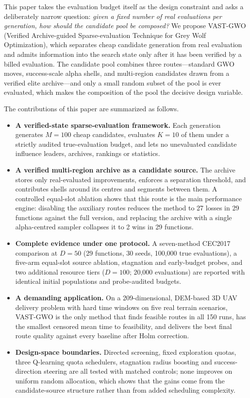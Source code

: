 \documentclass[journal]{IEEEtran}
\newcommand{\method}{VAST-GWO}
\begin{document}
This paper takes the evaluation budget itself as the design constraint and
asks a deliberately narrow question: \emph{given a fixed number of real
evaluations per generation, how should the candidate pool be composed?} We
propose \method{} (Verified Archive-guided Sparse-evaluation Technique for
Grey Wolf Optimization), which separates cheap candidate generation from real
evaluation and admits information into the search state only after it has
been verified by a billed evaluation. The candidate pool combines three
routes---standard GWO moves, success-scale alpha shells, and multi-region
candidates drawn from a verified elite archive---and only a small random
subset of the pool is ever evaluated, which makes the composition of the pool
the decisive design variable.

The contributions of this paper are summarized as follows.

\begin{itemize}
\item \textbf{A verified-state sparse-evaluation framework.} Each generation
generates $M=100$ cheap candidates, evaluates $K=10$ of them under a strictly
audited true-evaluation budget, and lets no unevaluated candidate influence
leaders, archives, rankings or statistics.
\item \textbf{A verified multi-region archive as a candidate source.} The
archive stores only real-evaluated improvements, enforces a separation
threshold, and contributes shells around its centres and segments between
them. A controlled equal-slot ablation shows that this route is the main
performance engine: disabling the auxiliary routes reduces the method to
27 losses in 29 functions against the full version, and replacing the archive
with a single alpha-centred sampler collapses it to 2 wins in 29 functions.
\item \textbf{Complete evidence under one protocol.} A seven-method CEC2017
comparison at $D=50$ (29 functions, 30 seeds, 100{,}000 true evaluations),
a five-arm equal-slot source ablation, stagnation and early-budget probes,
and two additional resource tiers ($D=100$; 20{,}000 evaluations) are
reported with identical initial populations and probe-audited budgets.
\item \textbf{A demanding application.} On a 209-dimensional, DEM-based 3D
UAV delivery problem with hard time windows on five real terrain scenarios,
\method{} is the only method that finds feasible routes in all 150 runs, has
the smallest censored mean time to feasibility, and delivers the best final
route quality against every baseline after Holm correction.
\item \textbf{Design-space boundaries.} Directed screening, fixed exploration
quotas, three Q-learning quota schedulers, stagnation radius boosting and
success-direction steering are all tested with matched controls; none
improves on uniform random allocation, which shows that the gains come from
the candidate-source structure rather than from added scheduling complexity.
\end{itemize}
\end{document}

